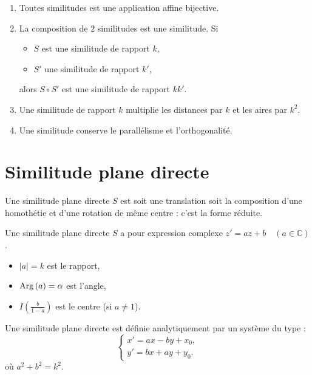             \begin{prop}
                  \begin{enumerate}
                        \item Toutes similitudes est une application affine bijective.
                        \item La composition de $2$ similitudes est une similitude.
                              Si
                              \begin{itemize}
                                    \item $S$ est une similitude de rapport $k$,
                                    \item $S'$ une similitude de rapport $k'$,
                              \end{itemize}
                              alors $S \circ S'$ est une similitude de rapport $kk'$.
                        \item Une similitude de rapport $k$ multiplie les distances par $k$ et les aires par $k^2$.
                        \item Une similitude conserve le parall\'elisme et l'orthogonalit\'e.
                  \end{enumerate}
            \end{prop}
      \section{Similitude plane directe}
            Une similitude plane directe $S$ est soit une translation
            soit la composition d'une homoth\'etie et d'une rotation de m\^eme centre :
            c'est la forme r\'eduite.
            
            Une similitude plane directe $S$ a pour expression complexe $z' = az + b \quad (a \in \mathbb{C})$.
            \begin{itemize}
                  \item $|a| = k$ est le rapport,
                  \item $\mathrm{Arg}\left( a \right) = \alpha$ est l'angle,
                  \item $I\left(\frac{b}{1-a}\right)$ est le centre (si $a\neq 1$).
            \end{itemize}
            
	            Une similitude plane directe est d\'efinie analytiquement par un syst\`eme du type :
	            \[
	                  \left\lbrace
	                  \begin{array}{l}
	                        x' = a x - b y + x_0, \\
	                        y' = b x + a y + y_0.
	                  \end{array}
	                  \right.
	            \]
	            o\`u $a^2 + b^2 = k^2$.
